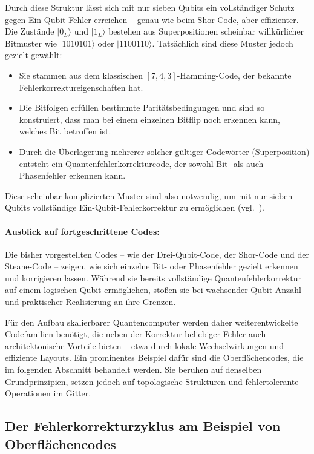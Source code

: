 Durch diese Struktur lässt sich mit nur sieben Qubits ein vollständiger Schutz gegen Ein-Qubit-Fehler erreichen – genau wie beim Shor-Code, aber effizienter.
Die Zustände \(|0_L\rangle\) und \(|1_L\rangle\) bestehen aus Superpositionen scheinbar willkürlicher Bitmuster wie \(|1010101\rangle\) oder \(|1100110\rangle\). Tatsächlich sind diese Muster jedoch gezielt gewählt:

\begin{itemize}
  \item Sie stammen aus dem klassischen \([7,4,3]\)-Hamming-Code, der bekannte Fehlerkorrektureigenschaften hat.
  \item Die Bitfolgen erfüllen bestimmte Paritätsbedingungen und sind so konstruiert, dass man bei einem einzelnen Bitflip noch erkennen kann, welches Bit betroffen ist.
  \item Durch die Überlagerung mehrerer solcher gültiger Codewörter (Superposition) entsteht ein Quantenfehlerkorrekturcode, der sowohl Bit- als auch Phasenfehler erkennen kann.
\end{itemize}
Diese scheinbar komplizierten Muster sind also notwendig, um mit nur sieben Qubits vollständige Ein-Qubit-Fehlerkorrektur zu ermöglichen (vgl.~\cite[12]{devitt_quantum_2013}).
\medskip
\paragraph{Ausblick auf fortgeschrittene Codes:}

Die bisher vorgestellten Codes – wie der Drei-Qubit-Code, der Shor-Code und der Steane-Code – zeigen, wie sich einzelne Bit- oder Phasenfehler gezielt erkennen und korrigieren lassen. Während sie bereits vollständige Quantenfehlerkorrektur auf einem logischen Qubit ermöglichen, stoßen sie bei wachsender Qubit-Anzahl und praktischer Realisierung an ihre Grenzen.

Für den Aufbau skalierbarer Quantencomputer werden daher weiterentwickelte Codefamilien benötigt, die neben der Korrektur beliebiger Fehler auch architektonische Vorteile bieten – etwa durch lokale Wechselwirkungen und effiziente Layouts. Ein prominentes Beispiel dafür sind die Oberflächencodes, die im folgenden Abschnitt behandelt werden. Sie beruhen auf denselben Grundprinzipien, setzen jedoch auf topologische Strukturen und fehlertolerante Operationen im Gitter.

\subsection{Der Fehlerkorrekturzyklus am Beispiel von Oberflächencodes}\label{chap:QEC3.2}


